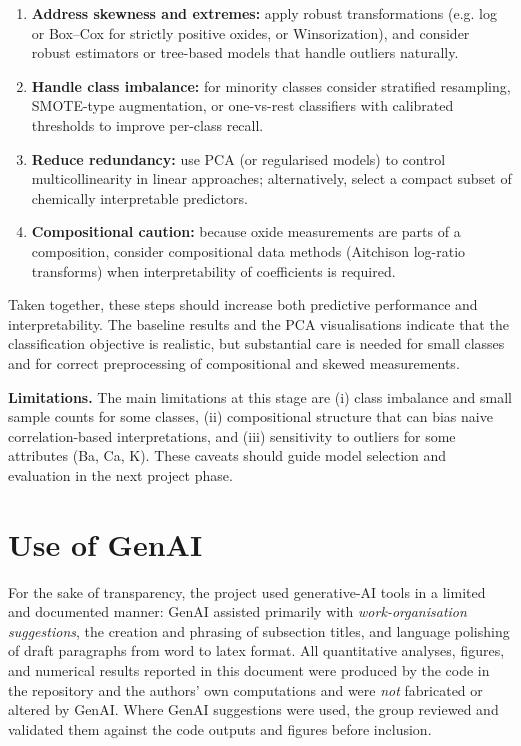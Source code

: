 \documentclass[dtu]{dtuarticle}
\begin{document}
	\begin{enumerate}
	  \item \textbf{Address skewness and extremes:} apply robust transformations (e.g. log or Box--Cox for
	    strictly positive oxides, or Winsorization), and consider robust estimators or tree-based models
	    that handle outliers naturally.
	  \item \textbf{Handle class imbalance:} for minority classes consider stratified resampling, SMOTE-type
	    augmentation, or one-vs-rest classifiers with calibrated thresholds to improve per-class recall.
	  \item \textbf{Reduce redundancy:} use PCA (or regularised models) to control multicollinearity in linear
	    approaches; alternatively, select a compact subset of chemically interpretable predictors.
	  \item \textbf{Compositional caution:} because oxide measurements are parts of a composition, consider
	    compositional data methods (Aitchison log-ratio transforms) when interpretability of coefficients is
	    required.
	\end{enumerate}
	
	Taken together, these steps should increase both predictive performance and interpretability. The
	baseline results and the PCA visualisations indicate that the classification objective is realistic, but
	substantial care is needed for small classes and for correct preprocessing of compositional and skewed
	measurements.
	
	\vspace{1ex}
	\noindent\textbf{Limitations.} The main limitations at this stage are (i) class imbalance and small sample
	counts for some classes, (ii) compositional structure that can bias naive correlation-based interpretations,
	and (iii) sensitivity to outliers for some attributes (Ba, Ca, K). These caveats should guide model
	selection and evaluation in the next project phase.
	


	\section*{Use of GenAI}
	For the sake of transparency, the project used generative-AI tools in a limited and documented manner:
	GenAI assisted primarily with \emph{work-organisation suggestions}, the creation and phrasing of
	subsection titles, and language polishing of draft paragraphs from word to latex format. All quantitative analyses, figures, and
	numerical results reported in this document were produced by the code in the repository and the
	authors' own computations and were \emph{not} fabricated or altered by GenAI. Where GenAI suggestions
	were used, the group reviewed and validated them against the code outputs and figures before inclusion.
	
\end{document}
